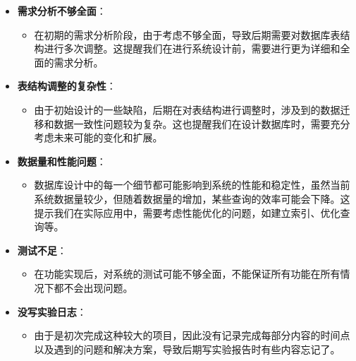 \documentclass{ctexart}
\begin{document}
	\begin{itemize}
		\item \textbf{需求分析不够全面}：
		\begin{itemize}
			\item 在初期的需求分析阶段，由于考虑不够全面，导致后期需要对数据库表结构进行多次调整。这提醒我们在进行系统设计前，需要进行更为详细和全面的需求分析。
		\end{itemize}
		
		\item \textbf{表结构调整的复杂性}：
		\begin{itemize}
			\item 由于初始设计的一些缺陷，后期在对表结构进行调整时，涉及到的数据迁移和数据一致性问题较为复杂。这也提醒我们在设计数据库时，需要充分考虑未来可能的变化和扩展。
		\end{itemize}
		
		\item \textbf{数据量和性能问题}：
		\begin{itemize}
			\item 数据库设计中的每一个细节都可能影响到系统的性能和稳定性，虽然当前系统数据量较少，但随着数据量的增加，某些查询的效率可能会下降。这提示我们在实际应用中，需要考虑性能优化的问题，如建立索引、优化查询等。
		\end{itemize}
		\item \textbf{测试不足}：
		\begin{itemize}
			\item 在功能实现后，对系统的测试可能不够全面，不能保证所有功能在所有情况下都不会出现问题。
		\end{itemize}
        \item \textbf{没写实验日志}：
        \begin{itemize}
			\item 由于是初次完成这种较大的项目，因此没有记录完成每部分内容的时间点以及遇到的问题和解决方案，导致后期写实验报告时有些内容忘记了。
		\end{itemize}
	\end{itemize}
    
\end{document}
